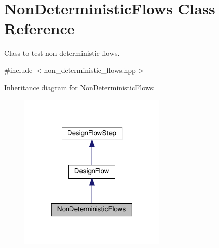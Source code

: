 \hypertarget{classNonDeterministicFlows}{}\section{Non\+Deterministic\+Flows Class Reference}
\label{classNonDeterministicFlows}


Class to test non deterministic flows.  




{\ttfamily \#include $<$non\+\_\+deterministic\+\_\+flows.\+hpp$>$}



Inheritance diagram for Non\+Deterministic\+Flows\+:
\nopagebreak
\begin{figure}[H]
\begin{center}
\leavevmode
\includegraphics[width=199pt]{db/de0/classNonDeterministicFlows__inherit__graph}
\end{center}
\end{figure}


